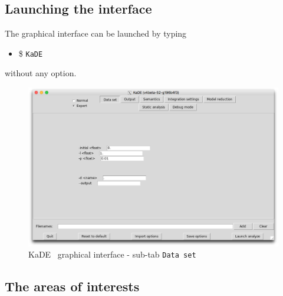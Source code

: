 \documentclass[11pt]{book}
\def\KaDE{\textsf{KaDE}}
\def\ttt#1{\texttt{#1}}
\def\ITE#1{\begin{itemize}#1\end{itemize}}
\begin{document}
\subsection{Launching the interface}

The graphical interface can be launched by typing
\ITE{\item[\$] \ttt{KaDE}}

without any option.

\begin{figure}[htbp]
\centering
\includegraphics[width=12cm,bb=0 0 1904 1208]{img/kade_0.png}
\caption{\KaDE~ graphical interface - sub-tab \texttt{Data set}}
\label{fig:kade:0}
\end{figure}

\subsection{The areas of interests}
\end{document}
